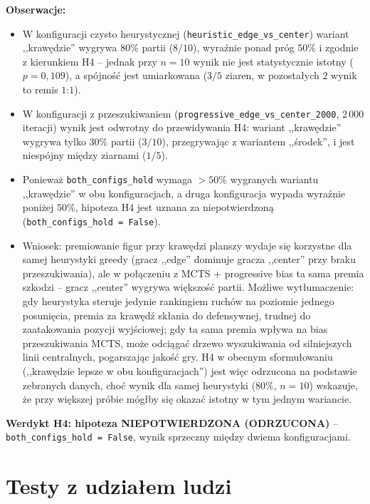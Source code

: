 \documentclass[11pt,a4paper]{article}
\begin{document}
\textbf{Obserwacje:}
\begin{itemize}
    \item W konfiguracji czysto heurystycznej
        (\texttt{heuristic\_edge\_vs\_center}) wariant ,,krawędzie''
        wygrywa $80\%$ partii ($8/10$), wyraźnie ponad próg $50\%$ i
        zgodnie z kierunkiem H4 -- jednak przy $n=10$ wynik nie jest
        statystycznie istotny ($p=0{,}109$), a spójność jest umiarkowana
        ($3/5$ ziaren, w pozostałych $2$ wynik to remis $1$:$1$).
    \item W konfiguracji z przeszukiwaniem
        (\texttt{progressive\_edge\_vs\_center\_2000}, $2\,000$ iteracji)
        wynik jest odwrotny do przewidywania H4: wariant
        ,,krawędzie'' wygrywa tylko $30\%$ partii ($3/10$), przegrywając
        z wariantem ,,środek'', i jest niespójny między ziarnami
        ($1/5$).
    \item Ponieważ \texttt{both\_configs\_hold} wymaga $>50\%$ wygranych
        wariantu ,,krawędzie'' w obu konfiguracjach, a druga
        konfiguracja wypada wyraźnie poniżej $50\%$, hipoteza H4 jest
        uznana za niepotwierdzoną
        (\texttt{both\_configs\_hold = False}).
    \item Wniosek: premiowanie figur przy krawędzi planszy wydaje się
        korzystne dla samej heurystyki greedy (gracz ,,edge''
        dominuje gracza ,,center'' przy braku przeszukiwania), ale w
        połączeniu z MCTS + progressive bias ta sama premia
        szkodzi -- gracz ,,center'' wygrywa większość partii.
        Możliwe wytłumaczenie: gdy heurystyka steruje jedynie rankingiem
        ruchów na poziomie jednego posunięcia, premia za krawędź skłania
        do defensywnej, trudnej do zaatakowania pozycji wyjściowej; gdy ta
        sama premia wpływa na bias przeszukiwania MCTS, może odciągać
        drzewo wyszukiwania od silniejszych linii centralnych, pogarszając
        jakość gry. H4 w obecnym sformułowaniu (,,krawędzie lepsze w obu
        konfiguracjach'') jest więc odrzucona na podstawie
        zebranych danych, choć wynik dla samej heurystyki ($80\%$,
        $n=10$) wskazuje, że przy większej próbie mógłby się okazać
        istotny w tym jednym wariancie.
\end{itemize}

\medskip
\noindent\textbf{Werdykt H4: hipoteza NIEPOTWIERDZONA (ODRZUCONA)} --
\texttt{both\_configs\_hold = False}, wynik sprzeczny między dwiema
konfiguracjami.


\section{Testy z udziałem ludzi}
\label{sec:ludzie}
\end{document}
